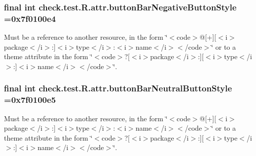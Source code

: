 \subsubsection[{button\+Bar\+Negative\+Button\+Style}]{\setlength{\rightskip}{0pt plus 5cm}final int check.\+test.\+R.\+attr.\+button\+Bar\+Negative\+Button\+Style =0x7f0100e4\hspace{0.3cm}{\ttfamily [static]}}\label{classcheck_1_1test_1_1_r_1_1attr_aa15b2310541c468ff8359b79c844bdb6}
Must be a reference to another resource, in the form \char`\"{}$<$code$>$@\mbox{[}+\mbox{]}\mbox{[}$<$i$>$package$<$/i$>$\+:\mbox{]}$<$i$>$type$<$/i$>$\+:$<$i$>$name$<$/i$>$$<$/code$>$\char`\"{} or to a theme attribute in the form \char`\"{}$<$code$>$?\mbox{[}$<$i$>$package$<$/i$>$\+:\mbox{]}\mbox{[}$<$i$>$type$<$/i$>$\+:\mbox{]}$<$i$>$name$<$/i$>$$<$/code$>$\char`\"{}. \hypertarget{classcheck_1_1test_1_1_r_1_1attr_a2dcc478f258562aa2b0462e764f8706c}{}
\subsubsection[{button\+Bar\+Neutral\+Button\+Style}]{\setlength{\rightskip}{0pt plus 5cm}final int check.\+test.\+R.\+attr.\+button\+Bar\+Neutral\+Button\+Style =0x7f0100e5\hspace{0.3cm}{\ttfamily [static]}}\label{classcheck_1_1test_1_1_r_1_1attr_a2dcc478f258562aa2b0462e764f8706c}
Must be a reference to another resource, in the form \char`\"{}$<$code$>$@\mbox{[}+\mbox{]}\mbox{[}$<$i$>$package$<$/i$>$\+:\mbox{]}$<$i$>$type$<$/i$>$\+:$<$i$>$name$<$/i$>$$<$/code$>$\char`\"{} or to a theme attribute in the form \char`\"{}$<$code$>$?\mbox{[}$<$i$>$package$<$/i$>$\+:\mbox{]}\mbox{[}$<$i$>$type$<$/i$>$\+:\mbox{]}$<$i$>$name$<$/i$>$$<$/code$>$\char`\"{}. \hypertarget{classcheck_1_1test_1_1_r_1_1attr_a9c25c7766ad861d2e9abc49971df83c5}{}
